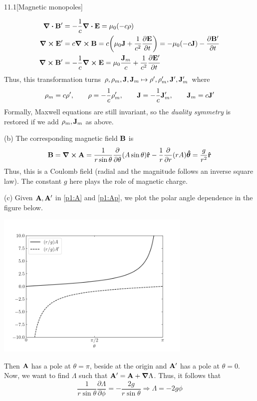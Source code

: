 \documentclass[12pt]{article}
\begin{document}
\begin{problem}{11.1}[Magnetic monopoles]
\begin{solution}
\begin{align}
    \div{\vb{B}'}&=-\frac1c\div{\vb{E}}=\mu_0\qty(-c\rho)\notag\\
    \curl{\vb{E}'}&=c\curl{\vb{B}}=c\qty(\mu_0\vb{J}+\frac1{c^2}\frac{\partial\vb{E}}{\partial
    t})=-\mu_0\qty(-c\vb{J})-\frac{\partial\vb{B}'}{\partial t}\notag\\
        \curl{\vb{B}'}&=-\frac1c\curl{\vb{E}}=\mu_0\frac{\vb{J}_m}{c}+\frac1{c^2}\frac{\partial\vb{E}'}{\partial
        t}
\end{align}
Thus, this transformation turns
$\rho,\rho_m,\vb{J},\vb{J}_m\mapsto\rho',\rho_m',\vb{J}',\vb{J}_m'$ where
\begin{equation}
    \rho_m=c\rho',\qquad
    \rho=-\frac1c\rho_m',\qquad
    \vb{J}=-\frac1c\vb{J}_m',\qquad
    \vb{J}_m=c\vb{J}'
\end{equation}
Formally, Maxwell equations are still invariant, so the \textit{duality 
symmetry} is restored if we add $\rho_m,\vb{J}_m$ as above.

(b) The corresponding magnetic field $\vb{B}$ is
\begin{equation}
    \vb{B}=\curl{\vb{A}}
    =\frac1{r\sin\theta}\frac{\partial}{\partial\theta}\qty(A\sin\theta)\vb{\hat{r}}
    -\frac1r\frac{\partial}{\partial r}\qty(rA)\bm{\hat{\theta}}
    =\frac{g}{r^2}\vb{\hat{r}}
\end{equation}
Thus, this is a Coulomb field (radial and the magnitude follows an inverse
square law). The constant $g$ here plays the role of magnetic charge.

(c) Given $\vb{A},\vb{A}'$ in \eqref{p1:A} and \eqref{p1:Ap}, we plot the polar
angle dependence in the figure below.
\begin{center}
    \includegraphics[width=0.7\textwidth]{p1.png}
\end{center}
Then $\vb{A}$ has a pole at $\theta=\pi$, beside at the origin and $\vb{A}'$ has
a pole at $\theta=0$. Now, we want to find $\Lambda$ such that
$\vb{A}'=\vb{A}+\grad\Lambda$. Thus, it follows that
\begin{equation}
    \frac{1}{r\sin\theta}\frac{\partial\Lambda}{\partial\phi}=-\frac{2g}{r\sin\theta}\Rightarrow\Lambda=-2g\phi 
\end{equation}


\end{solution}
\end{problem}
\end{document}
